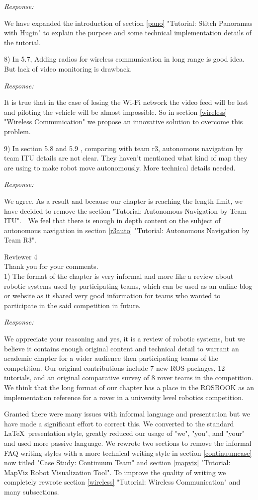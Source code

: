 \documentclass[runningheads,a4paper]{llncs}
\newcommand{\rsp}{\noindent \textit{Response:}}
\newcommand{\rev}[1]{
\newpage
\noindent Reviewer {#1}\\

\noindent Thank you for your comments.\\
}
\begin{document}
\rsp

We have expanded the introduction of section \ref{pano} "Tutorial: Stitch Panoramas with Hugin" to explain the purpose and some technical implementation details of the tutorial.

8)  In 5.7, Adding radios for wireless communication in long range is good idea. But lack of video monitoring is drawback.

\rsp

It is true that in the case of losing the Wi-Fi network the video feed will be lost and piloting the vehicle will be almost impossible. So in section \ref{wireless} "Wireless Communication" we propose an innovative solution to overcome this problem.

9)  In section 5.8 and 5.9 , comparing with team r3, autonomous navigation by team ITU details are not clear. They haven't mentioned what kind of map they are using to make robot move autonomously. More technical details needed.

\rsp

We agree. As a result and because our chapter is reaching the length limit, we have decided to remove the section "Tutorial: Autonomous Navigation by Team ITU". We feel that there is enough in depth content on the subject of autonomous navigation in section \ref{r3auto} "Tutorial: Autonomous Navigation by Team R3".

\rev{4}

1)  The format of the chapter is very informal and more like a review about robotic systems used by participating teams, which can be used as an online blog or website as it shared very good information for teams who wanted to participate in the said competition in future. 

\rsp

We appreciate your reasoning and yes, it is a review of robotic systems, but we believe it contains enough original content and technical detail to warrant an academic chapter for a wider audience then participating teams of the competition. Our original contributions include 7 new ROS packages, 12 tutorials, and an original comparative survey of 8 rover teams in the competition. We think that the long format of our chapter has a place in the ROSBOOK as an implementation reference for a rover in a university level robotics competition.

Granted there were many issues with informal language and presentation but we have made a significant effort to correct this. We converted to the standard \LaTeX\  presentation style, greatly reduced our usage of "we", "you", and "your" and used more passive language. We rewrote two sections to remove the informal FAQ writing styles with a more technical writing style in section \ref{continuumcase} now titled "Case Study: Continuum Team" and section \ref{mapviz} "Tutorial: MapViz Robot Visualization Tool". To improve the quality of writing we completely rewrote section \ref{wireless} "Tutorial: Wireless Communication" and many subsections.
\end{document}
